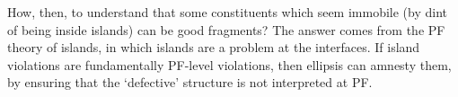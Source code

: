 \documentclass[11pt,letterpaper]{article}
\begin{document}
 How, then, to understand that some constituents which seem immobile (by dint of being inside islands) can be good fragments?
 The answer comes from the PF theory of islands, in which islands are a problem at the interfaces.
 If island violations are fundamentally PF-level violations, then ellipsis can amnesty them, by ensuring that the `defective' structure is not interpreted at PF.
 
 
 
\end{document}

